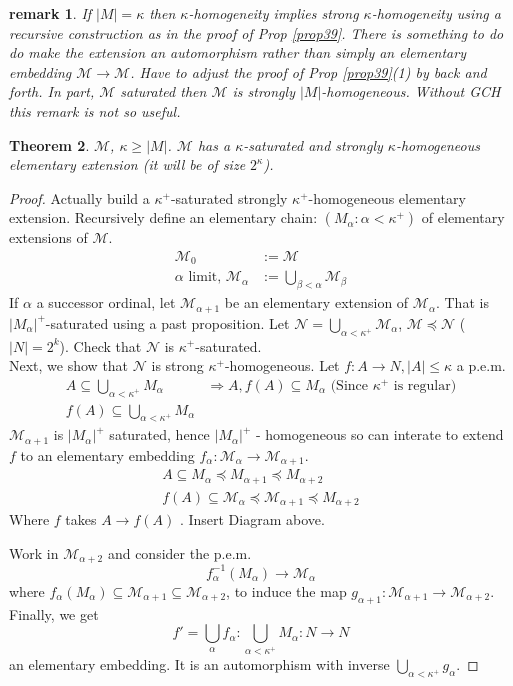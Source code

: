\documentclass[letterpaper, 12pt]{article}
\newcommand{\fin}{\qquad \quad \hfill \framebox[1.75mm][l]{\,}}
\newcommand{\cM}{\mathcal{M}}
\newcommand{\cN}{\mathcal{N}}
\theoremstyle{stdthm}
\newtheorem{thm}{Theorem}[section]
\theoremstyle{stddef}
\newtheorem{rem}[thm]{remark} %
\theoremstyle{stdnonum}
\theoremstyle{stdqands}
\theoremstyle{stdbold}
\begin{document}
\begin{rem}
If $|M|=\kappa$ then $\kappa$-homogeneity implies strong $\kappa$-homogeneity using a recursive construction as in the proof of Prop \ref{prop39}.  There is something to do do make the extension an automorphism rather than simply an elementary embedding $\cM \to \cM$. Have to adjust the proof of  Prop \ref{prop39}(1) by back and forth. In part, $\cM$ saturated then $\cM$ is strongly $|M|$-homogeneous. Without GCH this remark is not so useful. 
\end{rem}

\begin{thm}
$\cM$, $\kappa \geq |M|$. $\cM$ has a $\kappa$-saturated and strongly $\kappa$-homogeneous elementary extension (it will be of size $2^\kappa$). 
\end{thm}

\begin{proof}
Actually build a $\kappa^+$-saturated strongly $\kappa^+$-homogeneous elementary extension. Recursively define an elementary chain: $(M_\alpha: \alpha < \kappa^+)$ of elementary extensions of $\cM$. 
\begin{align*}
\cM_0 &:= \cM \\
\mbox{$\alpha$ limit, } \cM_\alpha &:= \bigcup_{\beta < \alpha} \cM_\beta
\end{align*}
If $\alpha$ a successor ordinal, let $\cM_{\alpha+1}$ be an elementary extension of $\cM_\alpha$. That is $|M_\alpha|^+$-saturated using a past proposition. Let $\cN = \bigcup_{\alpha < \kappa^+} \cM_\alpha$, $\cM \preceq \cN$ ($|N| = 2^k$). Check that $\cN$ is $\kappa^+$-saturated. \\

Next, we show that $\cN$ is strong $\kappa^+$-homogeneous. Let $f:A \to N, |A| \leq \kappa$ a p.e.m. 
\begin{align*}
A \subseteq \bigcup_{\alpha < \kappa^+} M_\alpha & \Rightarrow A, f(A) \subseteq M_\alpha \mbox{ (Since $\kappa^+$ is regular)}\\ 
f(A) \subseteq \bigcup_{\alpha < \kappa^+} M_\alpha
\end{align*}
$\cM_{\alpha+1}$ is $|M_\alpha|^+$ saturated, hence $|M_\alpha|^+$ - homogeneous so can interate to extend $f$ to an elementary embedding $f_\alpha: \cM_\alpha \to \cM_{\alpha+1}$. 
\begin{align*}
A \subseteq M_\alpha \preceq M_{\alpha +1} \preceq M_{\alpha +2} \\
f(A) \subseteq \cM_{\alpha} \preceq \cM_{\alpha +1} \preceq M_{\alpha+2}
\end{align*}
Where $f$ takes $A\to f(A)$ . Insert Diagram above. 

Work in $\cM_{\alpha+2}$ and consider the p.e.m. 
\[ f_\alpha^{-1}(M_\alpha) \to \cM_\alpha \]
where $f_\alpha(M_\alpha) \subseteq \cM_{\alpha+1} \subseteq \cM_{\alpha+2}$, to induce the map $g_{\alpha+1}: \cM_{\alpha + 1} \to \cM_{\alpha + 2}$. Finally, we get 
\[ f' = \bigcup_\alpha f_\alpha: \bigcup_{\alpha < \kappa^+} M_\alpha: N \to N\]
an elementary embedding. It is an automorphism with inverse $\bigcup_{\alpha < \kappa^+} g_\alpha$. 


\end{proof}
\end{document}
